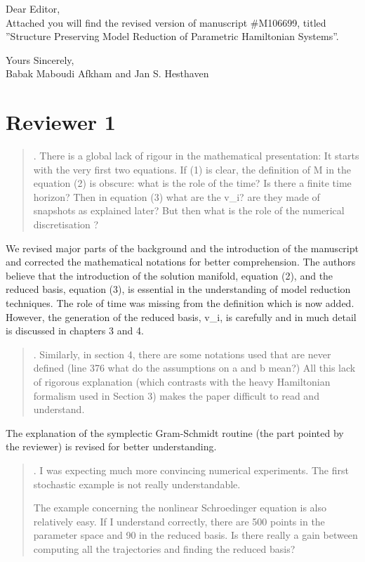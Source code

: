 \documentclass[a4paper]{article}
\newcommand{\breview}{\begin{quotation}\begin{bf}\noindent}
\newcommand{\ereview}{\end{bf}\end{quotation}}
\begin{document}
Dear Editor, \\[1cm]

Attached you will find the revised version of manuscript \#M106699, titled ''Structure Preserving Model Reduction of Parametric Hamiltonian Systems''.

Yours Sincerely,\\[1.0cm]
Babak Maboudi Afkham and
Jan S. Hesthaven
\\[1cm]

\section*{Reviewer 1}

\breview
1. There is a global lack of rigour in the mathematical presentation: It starts with the very first two equations. If (1) is clear, the definition of M in the equation (2) is obscure: what is the role of the time? Is there a finite time horizon? Then in equation (3) what are the v\_i? are they made of snapshots as explained later? But then what is the role of the numerical discretisation ?
\ereview

We revised major parts of the background and the introduction of the manuscript and corrected the mathematical notations for better comprehension. The authors believe that the introduction of the solution manifold, equation (2), and the reduced basis, equation (3), is essential in the understanding of model reduction techniques. The role of time was missing from the definition which is now added. However, the generation of the reduced basis, v\_i, is carefully and in much detail is discussed in chapters 3 and 4.

\breview
2. Similarly, in section 4, there are some notations used that are never defined (line 376 what do the assumptions on a and b mean?) All this lack of rigorous explanation (which contrasts with the heavy Hamiltonian formalism used in Section 3) makes the paper difficult to read and understand. 
\ereview

The explanation of the symplectic Gram-Schmidt routine (the part pointed by the reviewer) is revised for better understanding.

\breview
3. I was expecting much more convincing numerical experiments. The first stochastic example is not really understandable.

The example concerning the nonlinear Schroedinger equation is also relatively easy. If I understand correctly, there are 500 points in the parameter space and 90 in the reduced basis. Is there really a gain between computing all the trajectories and finding the reduced basis?
\ereview
\end{document}
